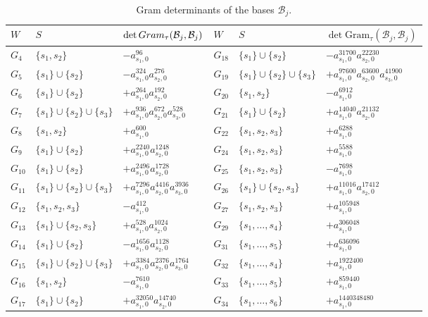 \documentclass[11pt, reqno]{amsart}
\newcommand{\gram}{\mathrm{Gram}}
\newcommand{\cB}{\mathcal{B}}
\numberwithin{equation}{section}
\theoremstyle{remark}
\begin{document}
\begin{table}[H]
	\centering
	\footnotesize
	\renewcommand{\arraystretch}{1.3}
	\begin{tabular}{lll|lll}
		$W$ & $S$ & $\det\mathrm\gram_{\tau}(\cB_j,\cB_j)$ & $W$ & $S$ & $\det\gram_{\tau}(\cB_j,\cB_j)$\\
		\hline
		$G_{4}$ & $\{s_1,s_2\}$ & $-a_{s_1,0}^{96}$ & $G_{18}$ & $\{s_1\}\cup\{s_2\}$ & $-a_{s_1,0}^{31700}a_{s_2,0}^{22230}$\\
		$G_{5}$ & $\{s_1\}\cup\{s_2\}$ & $-a_{s_1,0}^{324}a_{s_2,0}^{276}$ & $G_{19}$ & $\{s_1\}\cup\{s_2\}\cup\{s_3\}$ & $+a_{s_1,0}^{97600}a_{s_2,0}^{63600}a_{s_3,0}^{41900}$\\
		$G_{6}$ & $\{s_1\}\cup\{s_2\}$ & $+a_{s_1,0}^{264}a_{s_2,0}^{192}$ & $G_{20}$ & $\{s_1,s_2\}$ & $-a_{s_1,0}^{6912}$\\
		$G_{7}$ & $\{s_1\}\cup\{s_2\}\cup\{s_3\}$ & $+a_{s_1,0}^{936}a_{s_2,0}^{672}a_{s_3,0}^{528}$ & $G_{21}$ & $\{s_1\}\cup\{s_2\}$ & $+a_{s_1,0}^{14040}a_{s_2,0}^{21132}$\\
		$G_{8}$ & $\{s_1,s_2\}$ & $+a_{s_1,0}^{600}$ & $G_{22}$ & $\{s_1,s_2,s_3\}$ & $+a_{s_1,0}^{6288}$\\
		$G_{9}$ & $\{s_1\}\cup\{s_2\}$ & $+a_{s_1,0}^{2240}a_{s_2,0}^{1248}$ & $G_{24}$ & $\{s_1,s_2,s_3\}$ & $+a_{s_1,0}^{5588}$\\
		$G_{10}$ & $\{s_1\}\cup\{s_2\}$ & $+a_{s_1,0}^{2496}a_{s_2,0}^{1728}$ & $G_{25}$ & $\{s_1,s_2,s_3\}$ & $-a_{s_1,0}^{7698}$\\
		$G_{11}$ & $\{s_1\}\cup\{s_2\}\cup\{s_3\}$ & $+a_{s_1,0}^{7296}a_{s_2,0}^{4416}a_{s_3,0}^{3936}$ & $G_{26}$ & $\{s_1\}\cup\{s_2,s_3\}$ & $+a_{s_1,0}^{11016}a_{s_2,0}^{17412}$\\
		$G_{12}$ & $\{s_1,s_2,s_3\}$ & $-a_{s_1,0}^{412}$ & $G_{27}$ & $\{s_1,s_2,s_3\}$ & $+a_{s_1,0}^{105948}$\\
		$G_{13}$ & $\{s_1\}\cup\{s_2,s_3\}$ & $+a_{s_1,0}^{528}a_{s_2,0}^{1024}$ & $G_{29}$ & $\{s_1,\dots,s_4\}$ & $+a_{s_1,0}^{306048}$\\
		$G_{14}$ & $\{s_1\}\cup\{s_2\}$ & $-a_{s_1,0}^{1656}a_{s_2,0}^{1128}$ & $G_{31}$ & $\{s_1,\dots,s_5\}$ & $+a_{s_1,0}^{636096}$\\
		$G_{15}$ & $\{s_1\}\cup\{s_2\}\cup\{s_3\}$ & $+a_{s_1,0}^{3384}a_{s_2,0}^{2376}a_{s_3,0}^{1764}$ & $G_{32}$ & $\{s_1,\dots,s_4\}$ & $+a_{s_1,0}^{1922400}$\\
		$G_{16}$ & $\{s_1,s_2\}$ & $-a_{s_1,0}^{7610}$ & $G_{33}$ & $\{s_1,\dots,s_5\}$ & $+a_{s_1,0}^{859440}$\\
		$G_{17}$ & $\{s_1\}\cup\{s_2\}$ & $+a_{s_1,0}^{32050}a_{s_2,0}^{14740}$ & $G_{34}$ & $\{s_1,\dots,s_6\}$ & $+a_{s_1,0}^{1440348480}$\\
	\end{tabular}
	\caption{Gram determinants of the bases $\cB_j$.} 
	\label{tab:gramdets}
\end{table}
\end{document}
